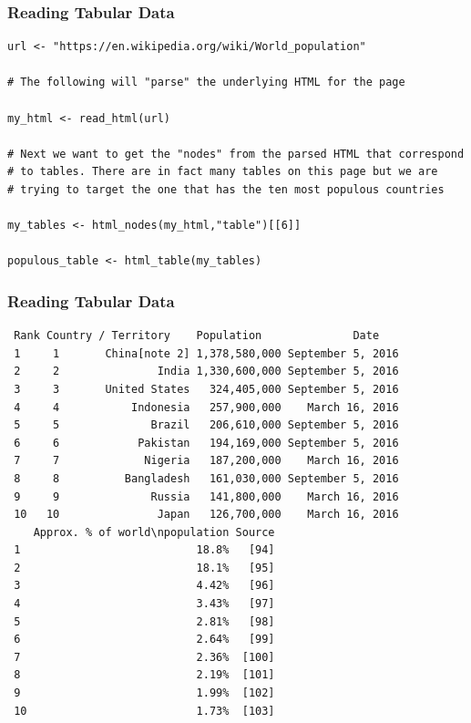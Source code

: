 \documentclass{beamer}
\begin{document}
%
\begin{frame}[fragile]
\frametitle{Reading Tabular Data}
\footnotesize
\begin{verbatim}
url <- "https://en.wikipedia.org/wiki/World_population"

# The following will "parse" the underlying HTML for the page

my_html <- read_html(url)

# Next we want to get the "nodes" from the parsed HTML that correspond 
# to tables. There are in fact many tables on this page but we are 
# trying to target the one that has the ten most populous countries

my_tables <- html_nodes(my_html,"table")[[6]]

populous_table <- html_table(my_tables)
\end{verbatim}

\end{frame}

%
\begin{frame}[fragile]
\frametitle{Reading Tabular Data}
\scriptsize
\begin{verbatim}
 Rank Country / Territory    Population              Date
 1     1       China[note 2] 1,378,580,000 September 5, 2016
 2     2               India 1,330,600,000 September 5, 2016
 3     3       United States   324,405,000 September 5, 2016
 4     4           Indonesia   257,900,000    March 16, 2016
 5     5              Brazil   206,610,000 September 5, 2016
 6     6            Pakistan   194,169,000 September 5, 2016
 7     7             Nigeria   187,200,000    March 16, 2016
 8     8          Bangladesh   161,030,000 September 5, 2016
 9     9              Russia   141,800,000    March 16, 2016
 10   10               Japan   126,700,000    March 16, 2016
    Approx. % of world\npopulation Source
 1                           18.8%   [94]
 2                           18.1%   [95]
 3                           4.42%   [96]
 4                           3.43%   [97]
 5                           2.81%   [98]
 6                           2.64%   [99]
 7                           2.36%  [100]
 8                           2.19%  [101]
 9                           1.99%  [102]
 10                          1.73%  [103]

\end{verbatim}

\end{frame}
\end{document}
